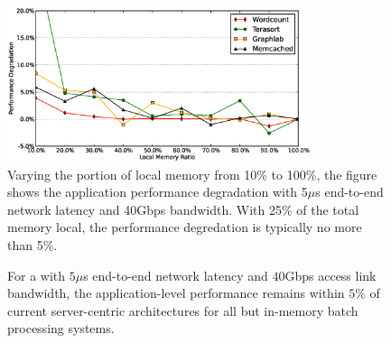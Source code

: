 %
\begin{figure}
  \centering
    \includegraphics[width = 3.5in]{img/vary_remote_mem.eps} 
  \caption{\small{Varying the portion of local memory from 10\% to 100\%, the figure shows the application performance degradation with 5$\mu$s end-to-end network latency and 40Gbps bandwidth. With 25\% of the total memory local, the performance degredation is typically no more than 5\%. }}
  \label{fig:impb}
\end{figure}
%
%
\begin{figure}

  \centering
  \caption{\small{For a \dis with $5\mu$s end-to-end network latency and $40$Gbps access link bandwidth, the application-level performance remains within $5\%$ of current server-centric architectures for all but in-memory batch processing systems.}}
  \label{fig:latb}
\end{figure}
%
